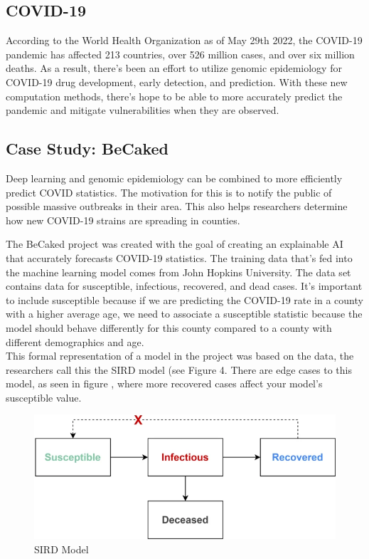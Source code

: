 \documentclass[12pt,journal,compsoc]{IEEEtran}
\begin{document}
\subsection{COVID-19}
According to the World Health Organization as of May 29th 2022, the COVID-19 pandemic has affected 213 countries, over 526 million cases, and over six million deaths. As a result, there's been an effort to utilize genomic epidemiology for COVID-19 drug development, early detection, and prediction. With these new computation methods, there's hope to be able to more accurately predict the pandemic and mitigate vulnerabilities when they are observed.  

\subsection{Case Study: BeCaked}
Deep learning and genomic epidemiology can be combined to more efficiently predict COVID statistics. The motivation for this is to notify the public of possible massive outbreaks in their area. This also helps researchers determine how new COVID-19 strains are spreading in counties. 

The BeCaked project was created with the goal of creating an explainable AI that accurately forecasts COVID-19 statistics\cite{Nguyen2022}. The training data that's fed into the machine learning model comes from John Hopkins University. The data set contains data for susceptible, infectious, recovered, and dead cases. It's important to include susceptible because if we are predicting the COVID-19 rate in a county with a higher average age, we need to associate a susceptible statistic because the model should behave differently for this county compared to a county with different demographics and age. \\
This formal representation of a model in the project was based on the data, the researchers call this the SIRD model (see Figure 4. There are edge cases to this model, as seen in figure , where more recovered cases affect your model's susceptible value.

\begin{figure}[H]
    \centering
    \includegraphics[width=\linewidth]{images/Screenshot 2022-06-07 at 21-30-50 BeCaked An Explainable Artificial Intelligence Model for COVID-19 Forecasting - Scientific Reports.png}
    \caption{SIRD Model}
    \label{fig:SIRD Model}
\end{figure}
\end{document}
